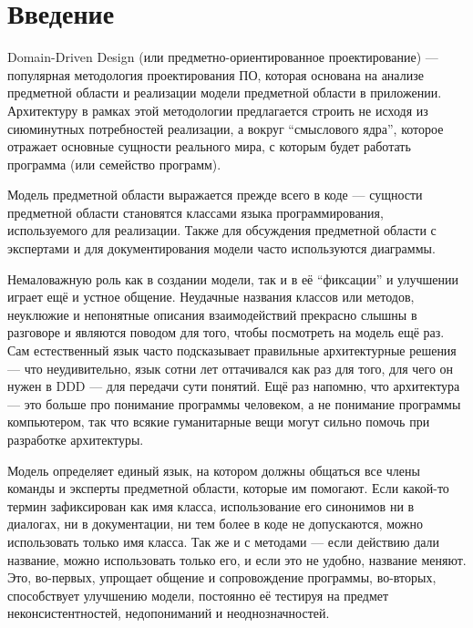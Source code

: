 \documentclass{../../text-style}
\begin{document}
\maketitle
\thispagestyle{empty}

\section{Введение}

 Domain-Driven Design (или предметно-ориентированное проектирование) --- популярная методология проектирования ПО, которая основана на анализе предметной области и реализации модели предметной области в приложении. Архитектуру в рамках этой методологии предлагается строить не исходя из сиюминутных потребностей реализации, а вокруг ``смыслового ядра'', которое отражает основные сущности реального мира, с которым будет работать программа (или семейство программ).

Модель предметной области выражается прежде всего в коде --- сущности предметной области становятся классами языка программирования, используемого для реализации. Также для обсуждения предметной области с экспертами и для документирования модели часто используются диаграммы.

Немаловажную роль как в создании модели, так и в её ``фиксации'' и улучшении играет ещё и устное общение. Неудачные названия классов или методов, неуклюжие и непонятные описания взаимодействий прекрасно слышны в разговоре и являются поводом для того, чтобы посмотреть на модель ещё раз. Сам естественный язык часто подсказывает правильные архитектурные решения --- что неудивительно, язык сотни лет оттачивался как раз для того, для чего он нужен в DDD --- для передачи сути понятий. Ещё раз напомню, что архитектура --- это больше про понимание программы человеком, а не понимание программы компьютером, так что всякие гуманитарные вещи могут сильно помочь при разработке архитектуры.

Модель определяет единый язык, на котором должны общаться все члены команды и эксперты предметной области, которые им помогают. Если какой-то термин зафиксирован как имя класса, использование его синонимов ни в диалогах, ни в документации, ни тем более в коде не допускаются, можно использовать только имя класса. Так же и с методами --- если действию дали название, можно использовать только его, и если это не удобно, название меняют. Это, во-первых, упрощает общение и сопровождение программы, во-вторых, способствует улучшению модели, постоянно её тестируя на предмет неконсистентностей, недопониманий и неоднозначностей.
\end{document}
